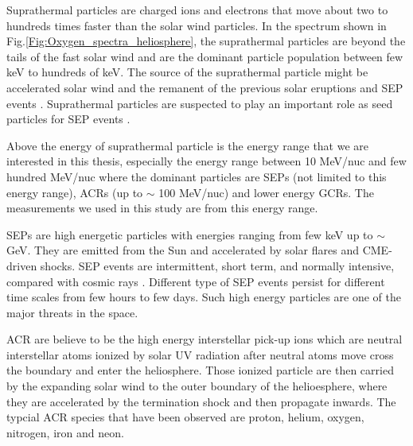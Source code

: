 
Suprathermal particles are charged ions and electrons that move about two to hundreds times faster than the solar wind particles. In the spectrum shown in Fig.\ref{Fig:Oxygen_spectra_heliosphere}, the suprathermal particles are beyond the tails of the fast solar wind and are the dominant particle population between few keV to hundreds of keV. The source of the suprathermal particle might be accelerated solar wind and the remanent of the previous solar eruptions and \ac{SEP} events \citep{Gloeckler1995SSRv}. Suprathermal particles are suspected to play an important role as seed particles for \ac{SEP} events \citep{Kahler2019ApJ}.

Above the energy of suprathermal particle is the energy range that we are interested in this thesis, especially the energy range between 10 MeV/nuc and few hundred MeV/nuc where the dominant particles are \acp{SEP} (not limited to this energy range), \acp{ACR} (up to $\sim$ 100 MeV/nuc) and lower energy \acp{GCR}. The measurements we used in this study are from this energy range.

\acp{SEP} are high energetic particles with energies ranging from few keV up to $\sim$ GeV. They are emitted from the Sun and accelerated by solar flares and \ac{CME}-driven shocks. \acs{SEP} events are intermittent, short term, and normally intensive, compared with cosmic rays \citep{Reames1999}. Different type of \acs{SEP} events persist for different time scales from few hours to few days. Such high energy particles are one of the major threats in the space.

\acs{ACR} are believe to be the high energy interstellar pick-up ions \citep{Giacalone2022SSRv} which are neutral interstellar atoms ionized by solar UV radiation after neutral atoms move cross the boundary and enter the heliosphere. Those ionized particle are then carried by the expanding solar wind to the outer boundary of the helioesphere, where they are accelerated by the termination shock and then propagate inwards. The typcial \ac{ACR} species that have been observed are proton, helium, oxygen, nitrogen, iron and neon. 

